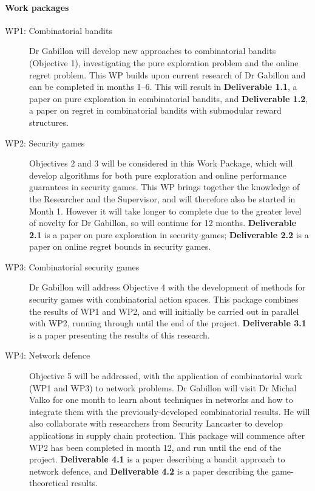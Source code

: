 \documentclass[a4paper,11pt]{article}
\begin{document}
\paragraph{Work packages}
\begin{description}
\item[WP1: Combinatorial bandits] Dr Gabillon will develop new approaches to combinatorial bandits (Objective 1), investigating the pure exploration problem and the online regret problem.  This WP builds upon current research of Dr Gabillon and can be completed in months 1--6.  This will result in {\bf Deliverable 1.1}, a paper on pure exploration in combinatorial bandits, and {\bf Deliverable 1.2}, a paper on regret in combinatorial bandits with submodular reward structures.
\item[WP2: Security games] Objectives 2 and 3 will be considered in this Work Package, which will develop algorithms for both pure exploration and online performance guarantees in security games.  This WP brings together the knowledge of the Researcher and the Supervisor, and will therefore also be started in Month 1.  However it will take longer to complete due to the greater level of novelty for Dr Gabillon, so will continue for 12 months.  {\bf Deliverable 2.1} is a paper on pure exploration in security games; {\bf Deliverable 2.2} is a paper on online regret bounds in security games.
\item[WP3: Combinatorial security games] Dr Gabillon will address Objective 4 with the development  of methods for security games with combinatorial action spaces. This package combines the results of WP1 and WP2, and will initially be carried out in parallel with WP2, running through until the end of the project.
{\bf Deliverable 3.1} is a paper presenting the results of this research.
\item[WP4: Network defence] Objective 5 will be addressed, with the application of combinatorial work (WP1 and WP3) to network problems. Dr Gabillon will visit Dr Michal Valko for one month to learn about techniques in networks and how to integrate them with the previously-developed combinatorial results.  He will also collaborate with researchers from Security Lancaster to develop applications in supply chain protection.  This package will commence after WP2 has been completed in month 12, and run until the end of the project. {\bf Deliverable 4.1} is a paper describing a bandit approach to network defence, and {\bf Deliverable 4.2} is a paper describing the game-theoretical results.
\end{description}
\end{document}
